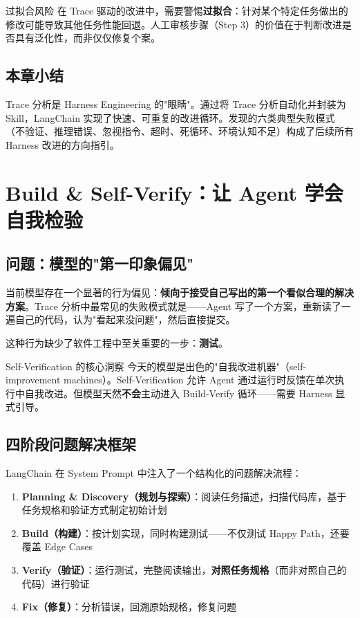 \documentclass[a4paper]{article}
\begin{document}
\begin{warningbox}{过拟合风险}
在 Trace 驱动的改进中，需要警惕\textbf{过拟合}：针对某个特定任务做出的修改可能导致其他任务性能回退。人工审核步骤（Step 3）的价值在于判断改进是否具有泛化性，而非仅仅修复个案。
\end{warningbox}

\subsection{本章小结}

Trace 分析是 Harness Engineering 的"眼睛"。通过将 Trace 分析自动化并封装为 Skill，LangChain 实现了快速、可重复的改进循环。发现的六类典型失败模式（不验证、推理错误、忽视指令、超时、死循环、环境认知不足）构成了后续所有 Harness 改进的方向指引。


\section{Build \& Self-Verify：让 Agent 学会自我检验}

\subsection{问题：模型的"第一印象偏见"}

当前模型存在一个显著的行为偏见：\textbf{倾向于接受自己写出的第一个看似合理的解决方案}。Trace 分析中最常见的失败模式就是——Agent 写了一个方案，重新读了一遍自己的代码，认为"看起来没问题"，然后直接提交。

这种行为缺少了软件工程中至关重要的一步：\textbf{测试}。

\begin{importantbox}{Self-Verification 的核心洞察}
今天的模型是出色的"自我改进机器"（self-improvement machines）。Self-Verification 允许 Agent 通过运行时反馈在单次执行中自我改进。但模型天然\textbf{不会}主动进入 Build-Verify 循环——需要 Harness 显式引导。
\end{importantbox}

\subsection{四阶段问题解决框架}

LangChain 在 System Prompt 中注入了一个结构化的问题解决流程：

\begin{enumerate}[leftmargin=2em]
    \item \textbf{Planning \& Discovery（规划与探索）}：阅读任务描述，扫描代码库，基于任务规格和验证方式制定初始计划
    \item \textbf{Build（构建）}：按计划实现，同时构建测试——不仅测试 Happy Path，还要覆盖 Edge Cases
    \item \textbf{Verify（验证）}：运行测试，完整阅读输出，\textbf{对照任务规格}（而非对照自己的代码）进行验证
    \item \textbf{Fix（修复）}：分析错误，回溯原始规格，修复问题
\end{enumerate}
\end{document}
